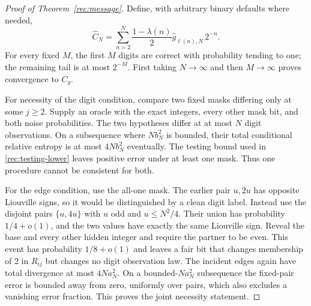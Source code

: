 \begin{proof}[Proof of Theorem~\ref{rec:message}]
Define, with arbitrary binary defaults where needed,
\[
 \widehat C_N=\sum_{n=2}^N
 \frac{1-\lambda(n)}2\widehat g_{\ell(n),N}\,2^{-n}.
\]
For every fixed $M$, the first $M$ digits are correct with probability
tending to one; the remaining tail is at most $2^{-M}$. First taking
$N\to\infty$ and then $M\to\infty$ proves convergence to $C_g$.

For necessity of the digit condition, compare two fixed masks differing
only at some $j\ge2$. Supply an oracle with the exact integers, every
other mask bit, and both noise probabilities. The two hypotheses
differ at at most $N$ digit observations. On a subsequence where
$Nb_N^2$ is bounded, their total conditional relative entropy is
at most $4Nb_N^2$ eventually. The testing bound used in
\eqref{rec:testing-lower} leaves positive error under at least one
mask. Thus one procedure cannot be consistent for both.

For the edge condition, use the all-one mask. The earlier pair
$u,2u$ has opposite Liouville signs, so it would be distinguished by
a clean digit label. Instead use the disjoint pairs
$\{u,4u\}$ with $u$ odd and $u\le N^2/4$. Their union has probability
$1/4+o(1)$, and the two values have exactly the same Liouville sign.
Reveal the base and every other hidden integer and require the partner
to be even. This event has probability $1/8+o(1)$ and leaves a fair
bit that changes membership of 2 in $R_{ij}$ but changes no digit
observation law. The incident edges again have total divergence at
most $4Na_N^2$. On a bounded-$Na_N^2$ subsequence the fixed-pair error
is bounded away from zero, uniformly over pairs, which also excludes
a vanishing error fraction. This proves the joint necessity statement.
\end{proof}
